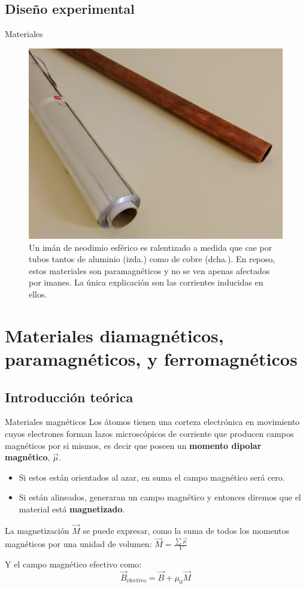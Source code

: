\documentclass[]{presentation}
\begin{document}
\subsection{Diseño experimental}
\begin{frame}{Materiales}
\begin{figure}
	\centering
	\includegraphics[width=.6\linewidth]{fig/experimentos/tubo_cobre_y_aluminio}
	\caption{\justifying Un imán de neodimio esférico es ralentizado a medida que cae por tubos tantos de aluminio (izda.) como de cobre (dcha.). En reposo, estos materiales son paramagnéticos y no se ven apenas afectados por imanes. La única explicación son las corrientes inducidas en ellos.}
\end{figure}
\end{frame}

\section{Materiales diamagnéticos, paramagnéticos, y ferromagnéticos}
\subsection{Introducción teórica}
\begin{frame}{Materiales magnéticos}
	\justifying
	Los átomos tienen una corteza electrónica en movimiento cuyos electrones forman lazos microscópicos de corriente que producen campos magnéticos por si mismos, es decir que poseen un \textbf{momento dipolar magnético}, $\vec{\mu}$.
	\begin{itemize}
		\item Si estos están orientados al azar, en suma el campo magnético será cero.
		\item Si están alineados, generaran un campo magnético y entonces diremos que el material está \textbf{magnetizado}.
	\end{itemize}
	La magnetización $\vec{M}$ se puede expresar, como la suma de todos los momentos magnéticos por una unidad de volumen:
	$
	\vec{M} = \frac{\sum{\vec{\mu}}}{V}
	$
	
	Y el campo magnético efectivo como:
	$$
	\vec{B}_\text{efectivo} = \vec{B} + \mu_0 \vec{M}
	$$

\end{frame}
\end{document}
